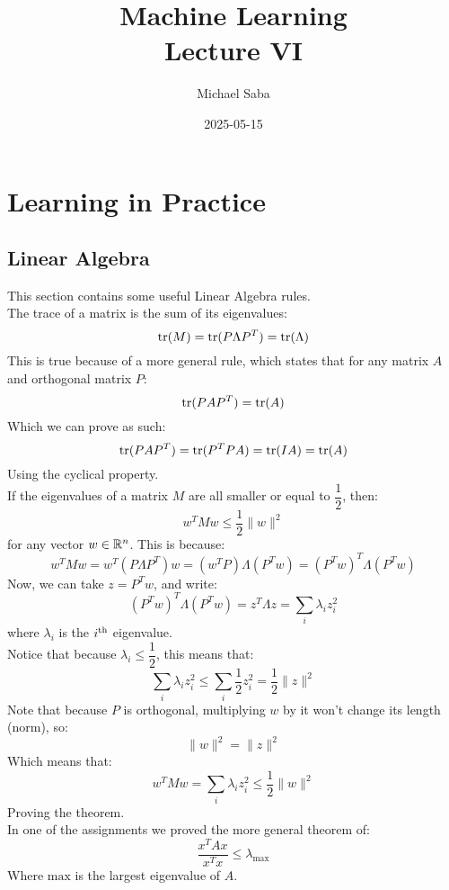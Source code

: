 \documentclass[12pt]{article}
\title{%
    \Huge Machine Learning \\
    \Large Lecture VI
}
\date{2025-05-15}
\author{Michael Saba}
\begin{document}
\maketitle
\newpage
\setlength{\parindent}{0pt}

\section*{Learning in Practice}

\subsection*{Linear Algebra}

This section contains some useful Linear
Algebra rules. \\

The trace of a matrix is the sum of its eigenvalues:
\[ \text{tr}(M) = \text{tr}(P\Lambda P^T) = \text{tr}(\Lambda) \]
This is true because of a more general rule,
which states that for any matrix $A$
and orthogonal matrix $P$:
\[ \text{tr}(PAP^T) = \text{tr}(A) \]
Which we can prove as such:
\[ \text{tr}(PAP^T) = \text{tr}(P^TPA) = \text{tr}(IA) = \text{tr}(A) \]
Using the cyclical property. \\

If the eigenvalues of a matrix $M$
are all smaller or equal to $\dfrac{1}{2}$,
then:
\[ w^TMw \leq \dfrac{1}{2} \|w\|^2 \]
for any vector $w \in \mathbb{R}^n$.
This is because:
\[ w^TMw = w^T(P\Lambda P^T)w
= (w^TP)\Lambda(P^Tw)
= (P^Tw)^T\Lambda(P^Tw) \]
Now, we can take $z = P^Tw$, and write:
\[ (P^Tw)^T\Lambda(P^Tw) 
= z^T \Lambda z = \sum_i \lambda_i z_i^2 \]
where $\lambda_i$ is the $i^{\text{th}}$ eigenvalue. \\
Notice that because $\lambda_i \leq \dfrac{1}{2}$,
this means that:
\[\sum_i \lambda_i z_i^2 
\leq \sum_i \dfrac{1}{2} z_i^2 = \dfrac{1}{2} \|z\|^2 \]
Note that because $P$ is orthogonal,
multiplying $w$ by it won't change its length
(norm), so:
\[ \|w\|^2 = \|z\|^2 \]
Which means that:
\[w^TMw = \sum_i \lambda_i z_i^2 
\leq \dfrac{1}{2} \|w\|^2\]
Proving the theorem. \\

In one of the assignments we proved the
more general theorem of:
\[ \dfrac{x^TAx}{x^Tx} \leq \lambda_{\text{max}} \]
Where $\text{max}$ is the largest
eigenvalue of $A$. \\
\end{document}
